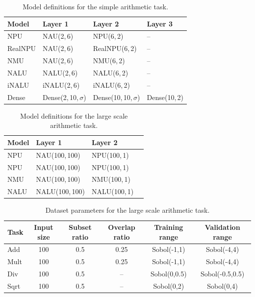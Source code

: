 \documentclass[9pt]{article}
\begin{document}
\begin{table}[h]
  \centering
  \caption{Model definitions for the simple arithmetic task.}
  \label{tab:models_simple_task}
  \begin{tabular}{llll}
    \toprule
    Model & Layer 1 & Layer 2 & Layer 3 \\
    \midrule
    NPU & NAU(2,\,6) & NPU(6,\,2) & -- \\
    RealNPU & NAU(2,\,6) & RealNPU(6,\,2) & -- \\
    NMU & NAU(2,\,6) & NMU(6,\,2) & -- \\
    NALU & NALU(2,\,6) & NALU(6,\,2) & -- \\
    iNALU & iNALU(2,\,6) & iNALU(6,\,2) & -- \\
    Dense & Dense(2,\,10,\,$\sigma$) & Dense(10,\,10,\,$\sigma$) & Dense(10,\,2) \\
    \bottomrule
  \end{tabular}
\end{table}

\begin{table}[h]
  \centering
  \caption{Model definitions for the large scale arithmetic task.}
  \label{tab:models_large_task}
  \begin{tabular}{llll}
    \toprule
    Model & Layer 1 & Layer 2\\
    \midrule
    NPU & NAU(100,\,100) & NPU(100,\,1) \\
    NPU & NAU(100,\,100) & NPU(100,\,1) \\
    NMU & NAU(100,\,100) & NMU(100,\,1) \\
    NALU & NALU(100,\,100) & NALU(100,\,1) \\
    \bottomrule
  \end{tabular}
\end{table}


\begin{table}[h]
  \centering
  \caption{Dataset parameters for the large scale arithmetic task.}
  \label{tab:dataset_params_large_scale}
  \begin{tabular}{lccccc}
    \toprule
    Task & Input size & Subset ratio & Overlap ratio & Training range  & Validation range\\
    \midrule
    Add  & 100        & 0.5          & 0.25          & Sobol(-1,1)     & Sobol(-4,4) \\
    Mult & 100        & 0.5          & 0.25          & Sobol(-1,1)     & Sobol(-4,4)\\
    Div  & 100        & 0.5          & --            & Sobol(0,0.5)    & Sobol(-0.5,0.5) \\
    Sqrt & 100        & 0.5          & --            & Sobol(0,2)      & Sobol(0,4) \\
    \bottomrule
  \end{tabular}
\end{table}
\end{document}
